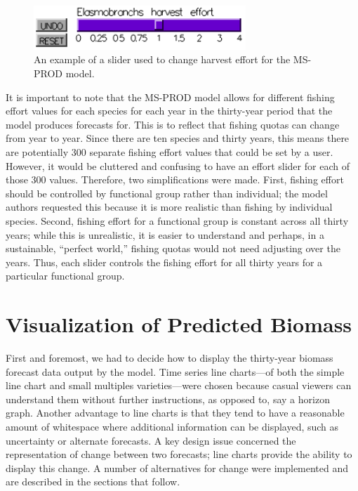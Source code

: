 \begin{figure}[h]
	\centering
	\includegraphics[width=8cm]{figures/png/slider.png}
	\caption{An example of a slider used to change harvest effort for the MS-PROD model.}
	\label{fig:slider}
\end{figure}

It is important to note that the MS-PROD model allows for different fishing effort values for each species for each year in the thirty-year period that the model produces forecasts for.  This is to reflect that fishing quotas can change from year to year.  Since there are ten species and thirty years, this means there are potentially 300 separate fishing effort values that could be set by a user.  However, it would be cluttered and confusing to have an effort slider for each of those 300 values.  Therefore, two simplifications were made.  First, fishing effort should be controlled by functional group rather than individual; the model authors requested this because it is more realistic than fishing by individual species.  Second, fishing effort for a functional group is constant across all thirty years; while this is unrealistic, it is easier to understand and perhaps, in a sustainable, ``perfect world,'' fishing quotas would not need adjusting over the years.  Thus, each slider controls the fishing effort for all thirty years for a particular functional group.

\section{Visualization of Predicted Biomass}

First and foremost, we had to decide how to display the thirty-year biomass forecast data output by the model.  Time series line charts---of both the simple line chart and small multiples varieties---were chosen because casual viewers can understand them without further instructions, as opposed to, say a horizon graph.  Another advantage to line charts is that they tend to have a reasonable amount of whitespace where additional information can be displayed, such as uncertainty or alternate forecasts. A key design issue concerned the representation of change between two forecasts; line charts provide the ability to display this change.  A number of alternatives for change were implemented and are described in the sections that follow.

